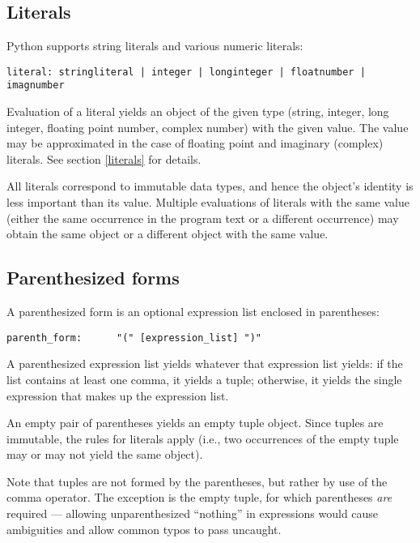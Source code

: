 \subsection{Literals\label{atom-literals}}

Python supports string literals and various numeric literals:

\begin{verbatim}
literal: stringliteral | integer | longinteger | floatnumber | imagnumber
\end{verbatim}

Evaluation of a literal yields an object of the given type (string,
integer, long integer, floating point number, complex number) with the
given value.  The value may be approximated in the case of floating
point and imaginary (complex) literals.  See section \ref{literals}
for details.

All literals correspond to immutable data types, and hence the
object's identity is less important than its value.  Multiple
evaluations of literals with the same value (either the same
occurrence in the program text or a different occurrence) may obtain
the same object or a different object with the same value.

\subsection{Parenthesized forms\label{parenthesized}}

A parenthesized form is an optional expression list enclosed in
parentheses:

\begin{verbatim}
parenth_form:      "(" [expression_list] ")"
\end{verbatim}

A parenthesized expression list yields whatever that expression list
yields: if the list contains at least one comma, it yields a tuple;
otherwise, it yields the single expression that makes up the
expression list.

An empty pair of parentheses yields an empty tuple object.  Since
tuples are immutable, the rules for literals apply (i.e., two
occurrences of the empty tuple may or may not yield the same object).

Note that tuples are not formed by the parentheses, but rather by use
of the comma operator.  The exception is the empty tuple, for which
parentheses \emph{are} required --- allowing unparenthesized ``nothing''
in expressions would cause ambiguities and allow common typos to
pass uncaught.

